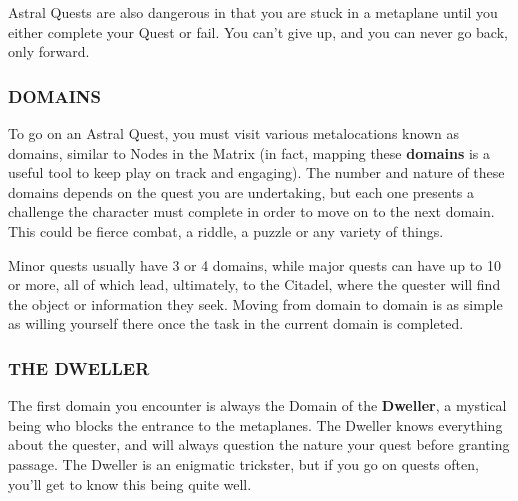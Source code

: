 \documentclass[oneside,10pt]{article}
\begin{document}
\begin{multicols}{2}
Astral Quests are also dangerous in that you are stuck in a
metaplane until you either complete your Quest or fail. You
can’t give up, and you can never go back, only forward.

\subsubsection{DOMAINS}
To go on an Astral Quest, you must visit various metalocations known as domains, similar to Nodes in the Matrix (in
fact, mapping these \textbf{domains} is a useful tool to keep play on
track and engaging). The number and nature of these domains depends on the quest you are undertaking, but each
one presents a challenge the character must complete in order to move on to the next domain. This could be fierce combat, a riddle, a puzzle or any variety of things.

Minor quests usually have 3 or 4 domains, while major quests
can have up to 10 or more, all of which lead, ultimately, to
the Citadel, where the quester will find the object or information they seek. Moving from domain to domain is as simple
as willing yourself there once the task in the current domain
is completed.

\subsubsection{THE DWELLER}
The first domain you encounter is always the Domain of the
\textbf{Dweller}, a mystical being who blocks the entrance to the
metaplanes. The Dweller knows everything about the quester,
and will always question the nature your quest before granting passage. The Dweller is an enigmatic trickster, but if you
go on quests often, you’ll get to know this being quite well.

\end{multicols}


\end{document}
